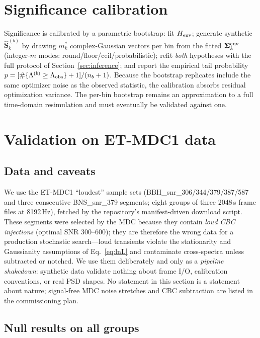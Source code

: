 \documentclass[11pt]{article}
\begin{document}
\section{Significance calibration}
\label{sec:bootstrap}

Significance is calibrated by a parametric bootstrap: fit $H_{\rm env}$; generate synthetic $\widehat{\mathbf{S}}_k^{(b)}$ by drawing $m^{*}_k$ complex-Gaussian vectors per bin from the fitted $\bm{\Sigma}^{\rm env}_k$ (integer-$m$ modes: round/floor/ceil/probabilistic); refit \emph{both} hypotheses with the full protocol of Section~\ref{sec:inference}; and report the empirical tail probability $p = [\#\{\Lambda^{(b)} \ge \Lambda_{\rm obs}\} + 1]/(n_b + 1)$. Because the bootstrap replicates include the same optimizer noise as the observed statistic, the calibration absorbs residual optimization variance. The per-bin bootstrap remains an approximation to a full time-domain resimulation and must eventually be validated against one.

\section{Validation on ET-MDC1 data}
\label{sec:results}

\subsection{Data and caveats}

We use the ET-MDC1 ``loudest'' sample sets (BBH\_snr\_306/344/379/387/587 and three consecutive BNS\_snr\_379 segments; eight groups of three 2048\,s frame files at 8192\,Hz), fetched by the repository's manifest-driven download script. These segments were selected by the MDC because they contain \emph{loud CBC injections} (optimal SNR 300--600); they are therefore the wrong data for a production stochastic search---loud transients violate the stationarity and Gaussianity assumptions of Eq.~\eqref{eq:lnL} and contaminate cross-spectra unless subtracted or notched. We use them deliberately and only as a \emph{pipeline shakedown}: synthetic data validate nothing about frame I/O, calibration conventions, or real PSD shapes. No statement in this section is a statement about nature; signal-free MDC noise stretches and CBC subtraction are listed in the commissioning plan.

\subsection{Null results on all groups}
\label{sec:nullresults}
\end{document}
